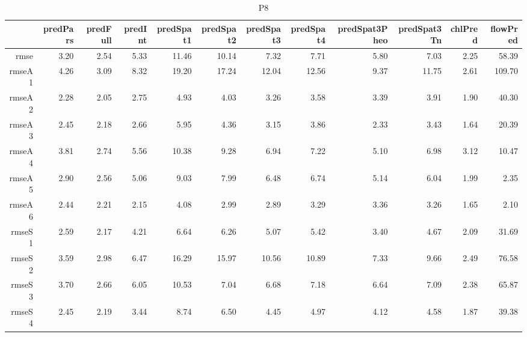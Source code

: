 \begin{table}[H]
\centering
\begingroup\fontsize{2.5pt}{4pt}\selectfont
\begin{tabular}{rrrrrrrrrrrr}
  \hline
 & predPars & predFull & predInt & predSpat1 & predSpat2 & predSpat3 & predSpat4 & predSpat3Pheo & predSpat3Tn & chlPred & flowPred \\ 
  \hline
rmse & 3.20 & 2.54 & 5.33 & 11.46 & 10.14 & 7.32 & 7.71 & 5.80 & 7.03 & 2.25 & 58.39 \\ 
  rmseA1 & 4.26 & 3.09 & 8.32 & 19.20 & 17.24 & 12.04 & 12.56 & 9.37 & 11.75 & 2.61 & 109.70 \\ 
  rmseA2 & 2.28 & 2.05 & 2.75 & 4.93 & 4.03 & 3.26 & 3.58 & 3.39 & 3.91 & 1.90 & 40.30 \\ 
  rmseA3 & 2.45 & 2.18 & 2.66 & 5.95 & 4.36 & 3.15 & 3.86 & 2.33 & 3.43 & 1.64 & 20.39 \\ 
  rmseA4 & 3.81 & 2.74 & 5.56 & 10.38 & 9.28 & 6.94 & 7.22 & 5.10 & 6.98 & 3.12 & 10.47 \\ 
  rmseA5 & 2.90 & 2.56 & 5.06 & 9.03 & 7.99 & 6.48 & 6.74 & 5.14 & 6.04 & 1.99 & 2.35 \\ 
  rmseA6 & 2.44 & 2.21 & 2.15 & 4.08 & 2.99 & 2.89 & 3.29 & 3.36 & 3.26 & 1.65 & 2.10 \\ 
  rmseS1 & 2.59 & 2.17 & 4.21 & 6.64 & 6.26 & 5.07 & 5.42 & 3.40 & 4.67 & 2.09 & 31.69 \\ 
  rmseS2 & 3.59 & 2.98 & 6.47 & 16.29 & 15.97 & 10.56 & 10.89 & 7.33 & 9.66 & 2.49 & 76.58 \\ 
  rmseS3 & 3.70 & 2.66 & 6.05 & 10.53 & 7.04 & 6.68 & 7.18 & 6.64 & 7.09 & 2.38 & 65.87 \\ 
  rmseS4 & 2.45 & 2.19 & 3.44 & 8.74 & 6.50 & 4.45 & 4.97 & 4.12 & 4.58 & 1.87 & 39.38 \\ 
   \hline
\end{tabular}
\endgroup
\caption{P8} 
\end{table}
